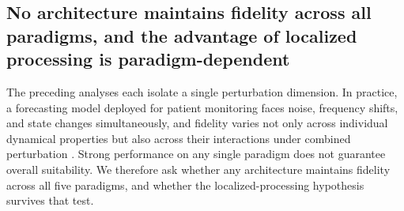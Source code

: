 %
%
%

\subsection*{No architecture maintains fidelity across all paradigms, and the advantage of localized processing is paradigm-dependent}

The preceding analyses each isolate a single perturbation dimension. In practice, a forecasting
model deployed for patient monitoring faces noise, frequency shifts, and state changes
simultaneously, and fidelity varies not only across individual dynamical properties but also
across their interactions under combined perturbation \cite{clifford2006advanced,
sornmo2005bioelectrical}. Strong performance on any single paradigm does not guarantee overall
suitability. We therefore ask whether any architecture maintains fidelity across all five
paradigms, and whether the localized-processing hypothesis survives that test.

